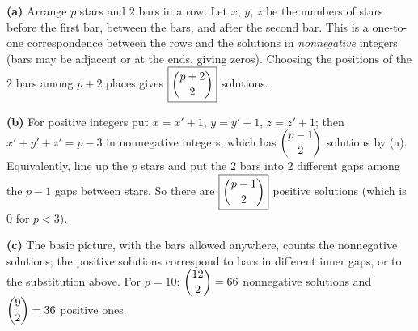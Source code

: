 \textbf{(a)} Arrange $p$ stars and $2$ bars in a row. Let $x$, $y$, $z$ be the numbers of stars before the first bar, between the bars, and after the second bar. This is a one-to-one correspondence between the rows and the solutions in \emph{nonnegative} integers (bars may be adjacent or at the ends, giving zeros). Choosing the positions of the $2$ bars among $p+2$ places gives $\boxed{\dbinom{p+2}{2}}$ solutions.

\textbf{(b)} For positive integers put $x=x'+1$, $y=y'+1$, $z=z'+1$; then $x'+y'+z'=p-3$ in nonnegative integers, which has $\dbinom{p-1}{2}$ solutions by (a). Equivalently, line up the $p$ stars and put the $2$ bars into $2$ different gaps among the $p-1$ gaps between stars. So there are $\boxed{\dbinom{p-1}{2}}$ positive solutions (which is $0$ for $p<3$).

\textbf{(c)} The basic picture, with the bars allowed anywhere, counts the nonnegative solutions; the positive solutions correspond to bars in different inner gaps, or to the substitution above. For $p=10$: $\dbinom{12}{2}=66$ nonnegative solutions and $\dbinom92=36$ positive ones.
